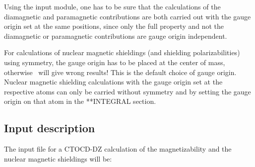 Using the  input module, one has to be sure that the
calculations of the diamagnetic and paramagnetic contributions are both
carried out with the gauge origin set at the same positions, since only
the full property and not the diamagnetic or paramagnetic contributions
are gauge origin independent.

For calculations of nuclear magnetic shieldings (and shielding
polarizabilities) using symmetry, the gauge origin has to be placed at the
center of mass, otherwise \dalton\ will give wrong results! This is the
default choice of gauge origin. Nuclear magnetic
shielding calculations with the gauge origin set at the respective atoms can
only be carried without symmetry and by setting the gauge origin on that atom
in the **INTEGRAL section.

\subsection{Input description}\label{sec:ctocdinput}

\begin{center}
\end{center}

The input file for a CTOCD-DZ calculation of the magnetizability and
the nuclear magnetic shieldings will be:

